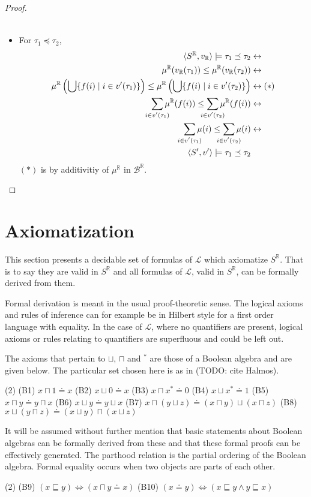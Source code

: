 \documentclass{article}
\newcommand{\R}{\mathbb{R}}
\newcommand{\B}{\mathcal{B}}
\newcommand{\lang}{\mathcal{L}}
\newcommand{\lcup}{\sqcup}
\newcommand{\lcap}{\sqcap}
\newcommand{\lstar}{^*}
\newcommand{\lpart}{\sqsubseteq}
\newcommand{\lparteq}{\doteq}
\newcommand{\lmeasure}{\preceq}
\begin{document}
\begin{proof}
\begin{itemize}
\begin{align*}
      \end{align*}
    \item For $\tau_1 \lmeasure \tau_2$,
      \begin{align*}
        \langle S^\R, v_\R \rangle \models \tau_1 \lmeasure \tau_2 &\leftrightarrow \\
        \mu^\R(v_\R(\tau_1)) \leq \mu^\R(v_\R(\tau_2)) &\leftrightarrow \\
        \mu^\R\left(\bigcup\{f(i) \mid i \in v'(\tau_1)\}\right) \leq \mu^\R\left(\bigcup\{f(i) \mid i \in v'(\tau_2)\}\right) &\leftrightarrow (*) \\
        \sum_{\mathclap{i \in v'(\tau_1)}}\mu^\R(f(i)) \leq \sum_{\mathclap{i \in v'(\tau_2)}}\mu^\R(f(i)) &\leftrightarrow \\
        \sum_{\mathclap{i \in v'(\tau_1)}}\mu(i) \leq \sum_{\mathclap{i \in v'(\tau_2)}}\mu(i) &\leftrightarrow \\
        \langle S', v' \rangle \models \tau_1 \lmeasure \tau_2
      \end{align*}
      $(*)$ is by additivitiy of $\mu^\R$ in $\B^\R$.
    \end{itemize}
\end{proof}
\section{Axiomatization}
This section presents a decidable set of formulas of $\lang$ which axiomatize $S^\R$. That is to say they are valid in $S^\R$ and all formulas of $\lang$, valid in $S^\R$, can be formally derived from them.

Formal derivation is meant in the usual proof-theoretic sense. The logical axioms and rules of inference can for example be in Hilbert style for a first order language with equality. In the case of $\lang$, where no quantifiers are present, logical axioms or rules relating to quantifiers are superfluous and could be left out.

The axioms that pertain to $\lcup$, $\lcap$ and $\lstar$ are those of a Boolean algebra and are given below. The particular set chosen here is as in (TODO: cite Halmos).
\begin{tasks}(2)
\task[] (B1) $x \lcap 1 \lparteq x$
\task[] (B2) $x \lcup 0 \lparteq x$
\task[] (B3) $x \lcap x\lstar \lparteq 0$
\task[] (B4) $x \lcup x\lstar \lparteq 1$
\task[] (B5) $x \lcap y \lparteq y \lcap x$
\task[] (B6) $x \lcup y \lparteq y \lcup x$
\task[] (B7) $x \lcap (y \lcup z) \lparteq (x \lcap y) \lcup (x \lcap z)$
\task[] (B8) $x \lcup (y \lcap z) \lparteq (x \lcup y) \lcap (x \lcup z)$
\end{tasks}
It will be assumed without further mention that basic statements about Boolean algebras can be formally derived from these and that these formal proofs can be effectively generated. The parthood relation is the partial ordering of the Boolean algebra. Formal equality occurs when two objects are parts of each other.
\begin{tasks}(2)
  \task[] (B9) $(x \lpart y) \Leftrightarrow (x \lcap y \lparteq x)$
  \task[] (B10) $(x \lparteq y) \Leftrightarrow (x \lpart y \land y \lpart x)$
\end{tasks}
\end{document}
